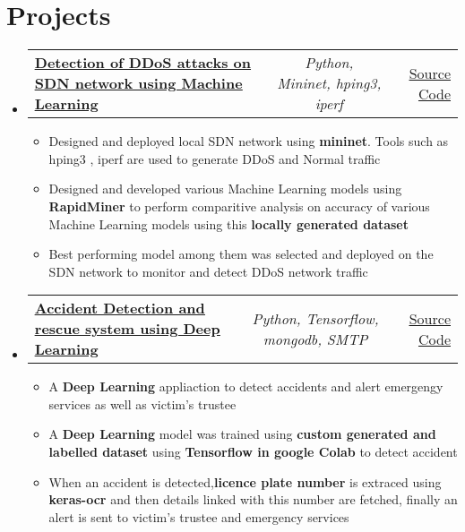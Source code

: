 \documentclass[a4paper,11pt]{article}
\makeatletter
\newcommand{\resumeItem}[1]{
  \item\small{#1}
}
\newcommand{\resumeItemListStart}{\begin{itemize}[rightmargin=0.11in]}
\newcommand{\resumeItemListEnd}{\end{itemize}}
\newcommand{\resumeTrioHeading}[3]{
  \item\small{
    \begin{tabular*}{0.96\textwidth}[t]{
      l@{\extracolsep{\fill}}c@{\extracolsep{\fill}}r
    }
      \textbf{#1} & \textit{#2} & #3
    \end{tabular*}
  }
}
\newcommand{\resumeHeadingListStart}{
  \begin{itemize}[leftmargin=0.15in, label={}]
}
\newcommand{\resumeHeadingListEnd}{\end{itemize}}
\makeatother
\begin{document}

\section{\color{amaranth} Projects}
  \resumeHeadingListStart{}
    \resumeTrioHeading{\href{https://github.com/Bhanudeep/Detection-of-DDoS-attacks-on-SDN-network-using-Machine-Learning-}{\uline{Detection of DDoS attacks on SDN  network using Machine Learning}}}{Python, Mininet, hping3, iperf }{\href{https://github.com/Bhanudeep/Detection-of-DDoS-attacks-on-SDN-network-using-Machine-Learning-/}{\uline{Source Code}}}
      \resumeItemListStart{}
      \resumeItem{Designed and deployed local SDN network using \textbf{mininet}. Tools such as hping3 , iperf are used to generate DDoS and Normal traffic}
        \resumeItem{Designed and developed various Machine Learning models using \textbf{RapidMiner} to perform comparitive analysis on accuracy of various Machine Learning models using this \textbf{locally generated dataset}}
        \resumeItem{Best performing model among them was selected and deployed on the SDN network to monitor and detect DDoS network traffic}
      \resumeItemListEnd{}

      \resumeTrioHeading{\href{https://github.com/Bhanudeep/Accident-Detection-and-Rescue-System-using-Deep-Learning}{\uline{Accident Detection and rescue system using Deep Learning}}}{Python, Tensorflow, mongodb, SMTP}{\href{https://github.com/Bhanudeep/Accident-Detection-and-Rescue-System-using-Deep-Learning}{\uline{Source Code}}}
      \resumeItemListStart{}
        \resumeItem{A \textbf{Deep Learning} appliaction to detect accidents and alert emergengy services as well as victim's trustee}
        \resumeItem{A \textbf{Deep Learning} model was trained using \textbf{custom generated and labelled dataset} using \textbf{Tensorflow in google Colab} to detect accident} \resumeItem{When an accident is detected,\textbf{licence plate number} is extraced using \textbf{keras-ocr} and then details linked with this number are fetched, finally an alert is sent to victim's trustee and emergency services}
      \resumeItemListEnd{}
  \resumeHeadingListEnd{}



\end{document}

